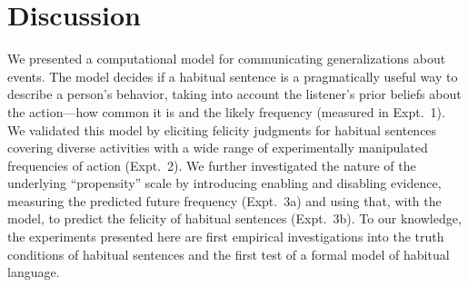 \documentclass[10pt,letterpaper]{article}
\begin{document}


%
%
%
%




\section{Discussion}
We presented a computational model for communicating generalizations about events.
The model decides if a habitual sentence is a pragmatically useful way to describe a person's behavior, taking into account the listener's prior beliefs about the action---how common it is and the likely frequency (measured in Expt.~1).
We validated this model by eliciting felicity judgments for habitual sentences covering diverse activities with a wide range of experimentally manipulated frequencies of action (Expt.~2).
We further investigated the nature of the underlying ``propensity'' scale by introducing enabling and disabling evidence, measuring the predicted future frequency (Expt.~3a) and using that, with the model, to predict the felicity of habitual sentences (Expt.~3b). 
To our knowledge, the experiments presented here are first empirical investigations into the truth conditions of habitual sentences and the first test of a formal model of habitual language.
\end{document}
